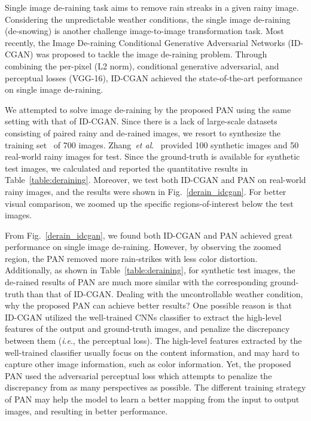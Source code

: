 \documentclass{article}
\newcommand{\etal}{\textit{et al}.}
\newcommand{\ie}{\textit{i}.\textit{e}.}
\begin{document}
Single image de-raining task aims to remove rain streaks in a given rainy image. Considering the unpredictable weather conditions, the single image de-raining (de-snowing) is another challenge image-to-image transformation task. Most recently, the Image De-raining Conditional Generative Adversarial Networks (ID-CGAN) was proposed to tackle the image de-raining problem. Through combining the per-pixel (L2 norm), conditional generative adversarial, and perceptual losses (VGG-16), ID-CGAN achieved the state-of-the-art performance on single image de-raining. 

We attempted to solve image de-raining by the proposed PAN using the same setting with that of ID-CGAN. Since there is a lack of large-scale datasets consisting of paired rainy and de-rained images, we resort to synthesize the training set~\cite{zhang2017image} of 700 images. Zhang~\etal~\cite{zhang2017image} provided 100 synthetic images and 50 real-world rainy images for test. Since the ground-truth is available for synthetic test images, we calculated and reported the quantitative results in Table~\ref{table:deraining}. Moreover, we test both ID-CGAN and PAN on real-world rainy images, and the results were shown in Fig.~\ref{derain_idcgan}. For better visual comparison, we zoomed up the specific regions-of-interest below the test images. 

From Fig.~\ref{derain_idcgan}, we found both ID-CGAN and PAN achieved great performance on single image de-raining. However, by observing the zoomed region, the PAN removed more rain-strikes with less color distortion. Additionally, as shown in Table~\ref{table:deraining}, for synthetic test images, the de-rained results of PAN are much more similar with the corresponding ground-truth than that of ID-CGAN. Dealing with the uncontrollable weather condition, why the proposed PAN can achieve better results? One possible reason is that ID-CGAN utilized the well-trained CNNs classifier to extract the high-level features of the output and ground-truth images, and penalize the discrepancy between them (\ie, the perceptual loss). The high-level features extracted by the well-trained classifier usually focus on the content information, and may hard to capture other image information, such as color information. Yet, the proposed PAN used the adversarial perceptual loss which attempts to penalize the discrepancy from as many perspectives as possible. The different training strategy of PAN may help the model to learn a better mapping from the input to output images, and resulting in better performance. 
\end{document}
